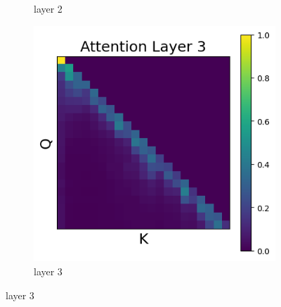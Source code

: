 \documentclass[11pt]{article}
\begin{document}
\begin{figure}[t]
\begin{subfigure}[t]{0.24\textwidth}
    \caption{layer 2}
  \end{subfigure}\hfill
  \begin{subfigure}[t]{0.24\textwidth}
    \centering
    \includegraphics[width=1.4\columnwidth]{figures/intervention1/layer_3.png}
    \caption{layer 3}
  \end{subfigure}\hfill


\end{figure}
\end{document}
